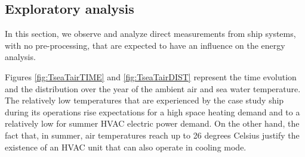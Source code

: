 \documentclass[preprint,12pt]{elsarticle}
\begin{document}
\subsection{Exploratory analysis} \label{sec:res:exploratory}

In this section, we observe and analyze direct measurements from ship systems, with no pre-processing, that are expected to have an influence on the energy analysis.

Figures \ref{fig:TseaTairTIME} and \ref{fig:TseaTairDIST} represent the time evolution and the distribution over the year of the ambient air and sea water temperature. The relatively low temperatures that are experienced by the case study ship during its operations rise expectations for a high space heating demand and to a relatively low for summer HVAC electric power demand. On the other hand, the fact that, in summer, air temperatures reach up to 26 degrees Celsius justify the existence of an HVAC unit that can also operate in cooling mode. 
\end{document}
